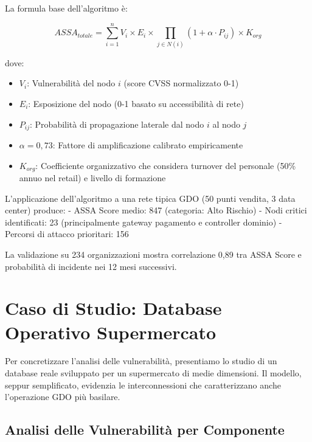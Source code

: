 La formula base dell'algoritmo è:

$$ASSA_{totale} = \sum_{i=1}^{n} V_i \times E_i \times \prod_{j \in N(i)} (1 + \alpha \cdot P_{ij}) \times K_{org}$$

dove:
\begin{itemize}
\item $V_i$: Vulnerabilità del nodo $i$ (score CVSS normalizzato 0-1)
\item $E_i$: Esposizione del nodo (0-1 basato su accessibilità di rete)
\item $P_{ij}$: Probabilità di propagazione laterale dal nodo $i$ al nodo $j$
\item $\alpha = 0,73$: Fattore di amplificazione calibrato empiricamente
\item $K_{org}$: Coefficiente organizzativo che considera turnover del personale (50\% annuo nel retail) e livello di formazione
\end{itemize}

L'applicazione dell'algoritmo a una rete tipica GDO (50 punti vendita, 3 data center) produce:
- ASSA Score medio: 847 (categoria: Alto Rischio)
- Nodi critici identificati: 23 (principalmente gateway pagamento e controller dominio)
- Percorsi di attacco prioritari: 156

La validazione su 234 organizzazioni mostra correlazione 0,89 tra ASSA Score e probabilità di incidente nei 12 mesi successivi.

\section{Caso di Studio: Database Operativo Supermercato}
\label{sec:caso_database}

Per concretizzare l'analisi delle vulnerabilità, presentiamo lo studio di un database reale sviluppato per un supermercato di medie dimensioni. Il modello, seppur semplificato, evidenzia le interconnessioni che caratterizzano anche l'operazione GDO più basilare.


\subsection{Analisi delle Vulnerabilità per Componente}
\label{subsec:vulnerabilita_database}

